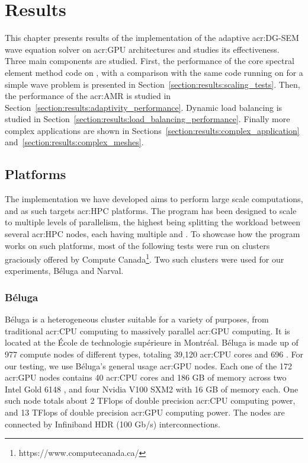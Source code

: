 \chapter{Results}\label{chapter:results}

This chapter presents results of the implementation of the adaptive \acrshort{acr:DG-SEM} wave
equation solver on \acrshort{acr:GPU} architectures and studies its effectiveness. Three main
components are studied. First, the performance of the core spectral element method code on
, with a comparison with the same code running on  for a
simple wave problem is presented in Section~\ref{section:results:scaling_tests}. Then, the
performance of the \acrlong{acr:AMR} is studied in
Section~\ref{section:results:adaptivity_performance}. Dynamic load balancing is studied in
Section~\ref{section:results:load_balancing_performance}. Finally more complex applications are
shown in Sections~\ref{section:results:complex_application}
and~\ref{section:results:complex_meshes}.

\section{Platforms}\label{section:results:platforms}

The implementation we have developed aims to perform large scale computations, and as such targets
\acrshort{acr:HPC} platforms. The program has been designed to scale to multiple levels of
parallelism, the highest being splitting the workload between several \acrshort{acr:HPC} nodes, each
having multiple  and . To showcase how the program works on
such platforms, most of the following tests were run on clusters graciously offered by Compute
Canada\footnote{https://www.computecanada.ca/}. Two such clusters were used for our experiments,
Béluga and Narval.

\subsection{Béluga}\label{subsection:results:platforms:beluga}

Béluga is a heterogeneous cluster suitable for a variety of purposes, from traditional
\acrshort{acr:CPU} computing to massively parallel \acrshort{acr:GPU} computing. It is located at
the École de technologie supérieure in Montréal. Béluga is made up of 977 compute nodes of different
types, totaling 39,120 \acrshort{acr:CPU} cores and 696 . For our testing, we
use Béluga's general usage \acrshort{acr:GPU} nodes. Each one of the 172 \acrshort{acr:GPU} nodes
contains 40 \acrshort{acr:CPU} cores and 186 GB of memory across two Intel Gold 6148
, and four Nvidia V100 SXM2  with 16 GB of memory each. One
such node totals about 2 TFlops of double precision \acrshort{acr:CPU} computing power, and 13
TFlops of double precision \acrshort{acr:GPU} computing power. The nodes are connected by Infiniband
HDR (100 Gb/s) interconnections.

